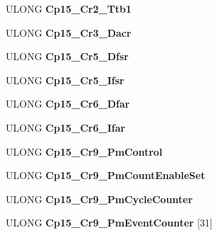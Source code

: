 \begin{DoxyCompactItemize}
U\+L\+O\+NG {\bfseries Cp15\+\_\+\+Cr2\+\_\+\+Ttb1}
\item 
\mbox{\label{struct___k_a_r_m___a_r_c_h___s_t_a_t_e_a0b239fb84ebb42644615a96b38413a38}} 
U\+L\+O\+NG {\bfseries Cp15\+\_\+\+Cr3\+\_\+\+Dacr}
\item 
\mbox{\label{struct___k_a_r_m___a_r_c_h___s_t_a_t_e_ad9762d45d2310820e3a1b0d6a77f3e87}} 
U\+L\+O\+NG {\bfseries Cp15\+\_\+\+Cr5\+\_\+\+Dfsr}
\item 
\mbox{\label{struct___k_a_r_m___a_r_c_h___s_t_a_t_e_ad80c9c2da7a2aab79573d5b5522aff90}} 
U\+L\+O\+NG {\bfseries Cp15\+\_\+\+Cr5\+\_\+\+Ifsr}
\item 
\mbox{\label{struct___k_a_r_m___a_r_c_h___s_t_a_t_e_ad33f9d9ba3e7bc8d99c3d03ea487b73a}} 
U\+L\+O\+NG {\bfseries Cp15\+\_\+\+Cr6\+\_\+\+Dfar}
\item 
\mbox{\label{struct___k_a_r_m___a_r_c_h___s_t_a_t_e_acb8866d036d3dbe87cc2bc197ae496f1}} 
U\+L\+O\+NG {\bfseries Cp15\+\_\+\+Cr6\+\_\+\+Ifar}
\item 
\mbox{\label{struct___k_a_r_m___a_r_c_h___s_t_a_t_e_a196b432159ee11f0ef34829f4c76ac8f}} 
U\+L\+O\+NG {\bfseries Cp15\+\_\+\+Cr9\+\_\+\+Pm\+Control}
\item 
\mbox{\label{struct___k_a_r_m___a_r_c_h___s_t_a_t_e_a86201b3f466bcd561161228cea541455}} 
U\+L\+O\+NG {\bfseries Cp15\+\_\+\+Cr9\+\_\+\+Pm\+Count\+Enable\+Set}
\item 
\mbox{\label{struct___k_a_r_m___a_r_c_h___s_t_a_t_e_a41cfd49fe3d4ce6f57ff36c22ef19dd5}} 
U\+L\+O\+NG {\bfseries Cp15\+\_\+\+Cr9\+\_\+\+Pm\+Cycle\+Counter}
\item 
\mbox{\label{struct___k_a_r_m___a_r_c_h___s_t_a_t_e_a919cd401f9c18e55652e4aa6ddc72fd6}} 
U\+L\+O\+NG {\bfseries Cp15\+\_\+\+Cr9\+\_\+\+Pm\+Event\+Counter} \mbox{[}31\mbox{]}
\item 

\end{DoxyCompactItemize}
